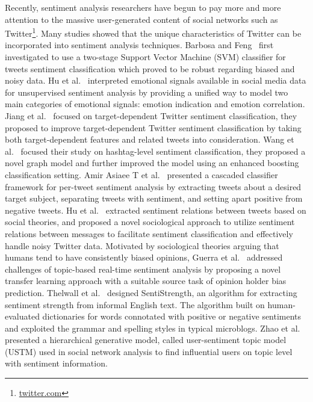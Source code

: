 \documentclass{llncs}
\begin{document}
Recently, sentiment analysis researchers have begun to pay more and more attention to the massive user-generated content of social networks such as Twitter\footnote{\url{twitter.com}}. 
Many studies showed that the unique characteristics of Twitter can be incorporated into sentiment analysis techniques.
Barbosa and Feng~\cite{Barbosa:2010RSD} first investigated to use a two-stage Support Vector Machine (SVM) classifier for tweets sentiment classification which proved to be robust regarding biased and noisy data. 
Hu et al.~\cite{Hu:2013www} interpreted emotional signals available in social media data for unsupervised sentiment analysis by providing a unified way to model two main categories of emotional signals: emotion indication and emotion correlation. 
Jiang et al.~\cite{xsongx:b6} focused on target-dependent Twitter sentiment classification, they proposed to improve target-dependent Twitter sentiment classification by taking both target-dependent features and related tweets into consideration. 
Wang et al.~\cite{Wang:2011TSA} focused their study on hashtag-level sentiment classification, they proposed a novel graph model and further improved the model using an enhanced boosting classification setting. 
Amir Asiaee T et al.~\cite{AsiaeeT:2012} presented a cascaded classifier framework for per-tweet sentiment analysis by extracting tweets about a desired target subject, separating tweets with sentiment, and  setting apart positive from negative tweets.
Hu et al.~\cite{Hu:2013ESR} extracted sentiment relations between tweets based on social theories, and proposed a novel sociological approach to utilize sentiment relations between messages to facilitate sentiment classification and effectively handle noisy Twitter data.
Motivated by sociological theories arguing that humans tend to have consistently biased opinions, Guerra et al.~\cite{CalaisGuerra:2011BOT} addressed challenges of topic-based real-time sentiment analysis by proposing a novel transfer learning approach with a suitable source task of opinion holder bias prediction.
Thelwall et al.~\cite{Thelwall:2010SSS,Thelwall:2012SSD} designed SentiStrength, an algorithm for extracting sentiment strength from informal English text. The algorithm built on human-evaluated dictionaries for words connotated with positive or negative sentiments and exploited the grammar and spelling styles in typical microblogs.
Zhao et al.~\cite{Zhao:2012UTM} presented a hierarchical generative model, called user-sentiment topic model (USTM) used in social network analysis to find influential users on topic level with sentiment information.
\end{document}
